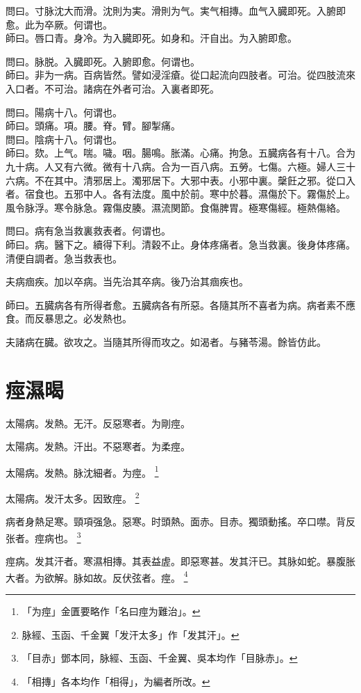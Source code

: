 \documentclass[b5paper,twoside,zihao=-4,UTF8]{ctexbook}
\begin{document}
問曰。寸脉沈大而滑。沈則为実。滑則为气。実气相摶。血气入臓即死。入腑即愈。此为卒厥。何谓也。\\
師曰。唇口青。身冷。为入臓即死。如身和。汗自出。为入腑即愈。

問曰。脉脱。入臓即死。入腑即愈。何谓也。\\
師曰。非为一病。百病皆然。譬如浸淫瘡。從口起流向四肢者。可治。從四肢流來入口者。不可治。{諸}病在外者可治。入裏者即死。

問曰。陽病十八。何谓也。\\
師曰。頭痛。項。腰。脊。臂。腳掣痛。\\
問曰。陰病十八。何谓也。\\
師曰。欬。上气。喘。噦。咽。腸鳴。胀滿。心痛。拘急。五臓病各有十八。合为九十病。人又有六微。微有十八病。合为一百八病。五勞。七傷。六極。婦人三十六病。不在其中。清邪居上。濁邪居下。大邪中表。小邪中裏。䅽飪之邪。從口入者。宿食也。五邪中人。各有法度。風中於前。寒中於暮。濕傷於下。霧傷於上。風令脉浮。寒令脉急。霧傷皮腠。濕流関節。食傷脾胃。極寒傷經。極熱傷絡。

問曰。病有急当救裏救表者。何谓也。\\
師曰。病。醫下之。續得下利。清穀不止。身体疼痛者。急当救裏。後身体疼痛。清便自調者。急当救表也。

夫病痼疾。加以卒病。当先治其卒病。後乃治其痼疾也。

師曰。五臓病各有所得者愈。五臓病各有所惡。各隨其所不喜者为病。病者素不應食。而反暴思之。必发熱也。

夫諸病在臓。欲攻之。当隨其所得而攻之。如渴者。与豬苓湯。餘皆仿此。

\chapter{痙濕暍}

太陽病。发熱。无汗。反惡寒者。为剛痙。

太陽病。发熱。汗出。不惡寒者。为柔痙。

太陽病。发熱。脉沈細者。为痙。
	\footnote{「为痙」金匱要略作「名曰痙为難治」。}

太陽病。发汗太多。因致痙。
	\footnote{脉經、玉函、千金翼「发汗太多」作「发其汗」。}

病者身熱足寒。頸項强急。惡寒。时頭熱。面赤。目赤。獨頭動搖。卒口噤。背反张者。痙病也。
	\footnote{「目赤」鄧本同，脉經、玉函、千金翼、吳本均作「目脉赤」。}

痙病。发其汗者。寒濕相摶。其表益虗。即惡寒甚。发其汗已。其脉如蛇。暴腹胀大者。为欲解。脉如故。反伏弦者。痙。
	\footnote{「相摶」各本均作「相得」，为編者所改。}
\end{document}
